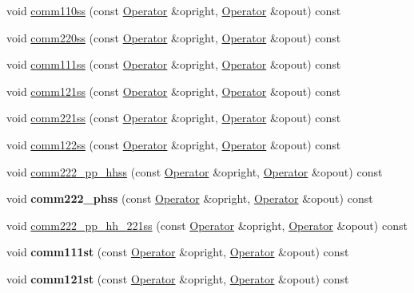 \begin{DoxyCompactItemize}
\item 
void \hyperlink{classOperator_a132a43b0a4a1a68e8f78af14e1eab069}{comm110ss} (const \hyperlink{classOperator}{Operator} \&opright, \hyperlink{classOperator}{Operator} \&opout) const 
\item 
void \hyperlink{classOperator_aca98d46760c33cd12056701031cc6b4c}{comm220ss} (const \hyperlink{classOperator}{Operator} \&opright, \hyperlink{classOperator}{Operator} \&opout) const 
\item 
void \hyperlink{classOperator_aa99f1f8918be7c5669ba9a60bed3d9cd}{comm111ss} (const \hyperlink{classOperator}{Operator} \&opright, \hyperlink{classOperator}{Operator} \&opout) const 
\item 
void \hyperlink{classOperator_a1180fa3d9923da924aa8d17042c23ed5}{comm121ss} (const \hyperlink{classOperator}{Operator} \&opright, \hyperlink{classOperator}{Operator} \&opout) const 
\item 
void \hyperlink{classOperator_a1a67d9f834722d027cda1525356c436b}{comm221ss} (const \hyperlink{classOperator}{Operator} \&opright, \hyperlink{classOperator}{Operator} \&opout) const 
\item 
void \hyperlink{classOperator_aa47907c535f84e5775b92294a90c2101}{comm122ss} (const \hyperlink{classOperator}{Operator} \&opright, \hyperlink{classOperator}{Operator} \&opout) const 
\item 
void \hyperlink{classOperator_a5f0ebafd8284747ca0dcb35bf2fd4fb0}{comm222\-\_\-pp\-\_\-hhss} (const \hyperlink{classOperator}{Operator} \&opright, \hyperlink{classOperator}{Operator} \&opout) const 
\item 
\hypertarget{classOperator_ac9b04d839872bbae8dbc5d7e8ee8ab56}{void {\bfseries comm222\-\_\-phss} (const \hyperlink{classOperator}{Operator} \&opright, \hyperlink{classOperator}{Operator} \&opout) const }\label{classOperator_ac9b04d839872bbae8dbc5d7e8ee8ab56}

\item 
void \hyperlink{classOperator_a26be1b965a86598764be26a11490de6b}{comm222\-\_\-pp\-\_\-hh\-\_\-221ss} (const \hyperlink{classOperator}{Operator} \&opright, \hyperlink{classOperator}{Operator} \&opout) const 
\item 
\hypertarget{classOperator_aba1d1f2bee572d9e845711c28487b680}{void {\bfseries comm111st} (const \hyperlink{classOperator}{Operator} \&opright, \hyperlink{classOperator}{Operator} \&opout) const }\label{classOperator_aba1d1f2bee572d9e845711c28487b680}

\item 
\hypertarget{classOperator_a31e74fba9493fc6828402743657c4acf}{void {\bfseries comm121st} (const \hyperlink{classOperator}{Operator} \&opright, \hyperlink{classOperator}{Operator} \&opout) const }\label{classOperator_a31e74fba9493fc6828402743657c4acf}


\end{DoxyCompactItemize}
